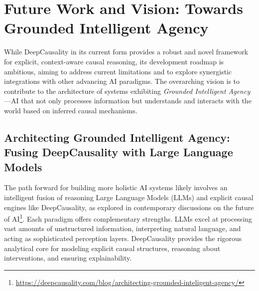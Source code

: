 \section{Future Work and Vision: Towards Grounded Intelligent Agency}
\label{sec:future_work}

While DeepCausality in its current form provides a robust and novel framework for explicit, context-aware causal reasoning, its development roadmap is ambitious, aiming to address current limitations and to explore synergistic integrations with other advancing AI paradigms. The overarching vision is to contribute to the architecture of systems exhibiting \textit{Grounded Intelligent Agency}---AI that not only processes information but understands and interacts with the world based on inferred causal mechanisms.

\subsection{Architecting Grounded Intelligent Agency: Fusing DeepCausality with Large Language Models}

The path forward for building more holistic AI systems likely involves an intelligent fusion of reasoning Large Language Models (LLMs) and explicit causal engines like DeepCausality, as explored in contemporary discussions on the future of AI\footnote{\url{https://deepcausality.com/blog/architecting-grounded-inteligent-agency/}}. Each paradigm offers complementary strengths. LLMs excel at processing vast amounts of unstructured information, interpreting natural language, and acting as sophisticated perception layers. DeepCausality provides the rigorous analytical core for modeling explicit causal structures, reasoning about interventions, and ensuring explainability.

